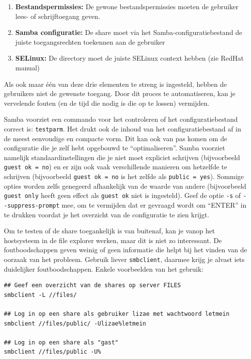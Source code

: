 \begin{enumerate}
\def\labelenumi{\arabic{enumi}.}
\item \textbf{Bestandspermissies:} De gewone bestandspermissies moeten de gebruiker lees- of schrijftoegang geven.
\item \textbf{Samba configuratie:} De share moet via het Samba-configuratiebestand  de juiste toegangsrechten toekennen aan de gebruiker
\item \textbf{SELinux:} De directory moet de juiste SELinux context hebben (zie RedHat manual)
\end{enumerate}

Als ook maar één van deze drie elementen te streng is ingesteld, hebben de gebruikers niet de gewenste toegang. Door dit proces te automatiseren, kan je vervelende fouten (en de tijd die nodig is die op te lossen) vermijden.

Samba voorziet een commando voor het controleren of het configuratiebestand  correct is: \texttt{testparm}. Het drukt ook de inhoud van het configuratiebestand af in de meest eenvoudige en compacte vorm. Dit kan ook van pas komen om de configuratie die je zelf hebt opgebouwd te ``optimaliseren''. Samba voorziet namelijk standaardinstellingen die je niet moet expliciet schrijven (bijvoorbeeld \texttt{guest\ ok\ =\ no}) en er zijn ook vaak verschillende manieren om hetzelfde te schrijven (bijvoorbeeld \texttt{guest\ ok\ =\ no} is het zelfde als \texttt{public\ =\ yes}). Sommige opties worden zelfs genegeerd afhankelijk van de waarde van andere (bijvoorbeeld \texttt{guest\ only} heeft geen effect als \texttt{guest\ ok} niet is ingesteld). Geef de optie \texttt{-s} of \texttt{-\/-suppress-prompt} mee, om te vermijden dat er gevraagd wordt om ``ENTER'' in te drukken voordat je het overzicht van de configuratie te zien krijgt.

Om te testen of de share toegankelijk is van buitenaf, kan je vanop het hostsysteem in de file explorer werken, maar dit is niet zo interessant.  De foutboodschappen geven weinig of geen informatie die helpt bij het vinden van de oorzaak van het probleem. Gebruik liever \texttt{smbclient}, daarmee krijg je alvast iets duidelijker foutboodschappen. Enkele voorbeelden van het gebruik:

\begin{verbatim}
## Geef een overzicht van de shares op server FILES
smbclient -L //files/

## Log in op een share als gebruiker lizae met wachtwoord letmein
smbclient //files/public/ -Ulizae%letmein

## Log in op een share als "gast"
smbclient //files/public -U%
\end{verbatim}

